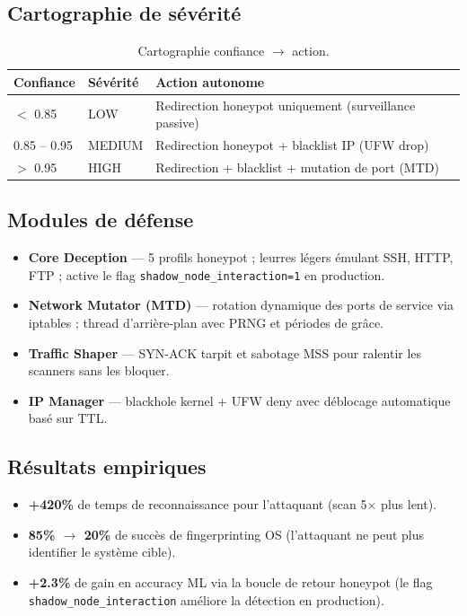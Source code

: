 \documentclass[12pt,a4paper]{article}
\begin{document}
\subsection{Cartographie de s\'{e}v\'{e}rit\'{e}}

\begin{table}[h!]
\centering
\begin{tabular}{l l l}
\toprule
\textbf{Confiance} & \textbf{S\'{e}v\'{e}rit\'{e}} & \textbf{Action autonome} \\
\midrule
$<$ 0.85      & LOW    & Redirection honeypot uniquement (surveillance passive) \\
0.85 -- 0.95  & MEDIUM & Redirection honeypot + blacklist IP (UFW drop) \\
$>$ 0.95      & HIGH   & Redirection + blacklist + mutation de port (MTD) \\
\bottomrule
\end{tabular}
\caption{Cartographie confiance $\rightarrow$ action.}
\end{table}

\subsection{Modules de d\'{e}fense}

\begin{itemize}[nosep,leftmargin=1.5em]
  \item \textbf{Core Deception} --- 5 profils honeypot ; leurres l\'{e}gers
        \'{e}mulant SSH, HTTP, FTP ; active le flag
        \texttt{shadow\_node\_interaction=1} en production.
  \item \textbf{Network Mutator (MTD)} --- rotation dynamique des ports de
        service via iptables ; thread d'arri\`{e}re-plan avec PRNG et p\'{e}riodes
        de gr\^{a}ce.
  \item \textbf{Traffic Shaper} --- SYN-ACK tarpit et sabotage MSS pour
        ralentir les scanners sans les bloquer.
  \item \textbf{IP Manager} --- blackhole kernel + UFW deny avec
        d\'{e}blocage automatique bas\'{e} sur TTL.
\end{itemize}

\subsection{R\'{e}sultats empiriques}

\begin{itemize}[nosep,leftmargin=1.5em]
  \item \textbf{+420\%} de temps de reconnaissance pour l'attaquant
        (scan 5$\times$ plus lent).
  \item \textbf{85\% $\rightarrow$ 20\%} de succ\`{e}s de fingerprinting OS
        (l'attaquant ne peut plus identifier le syst\`{e}me cible).
  \item \textbf{+2.3\%} de gain en accuracy ML via la boucle de retour honeypot
        (le flag \texttt{shadow\_node\_interaction} am\'{e}liore la d\'{e}tection
        en production).
\end{itemize}
\end{document}
